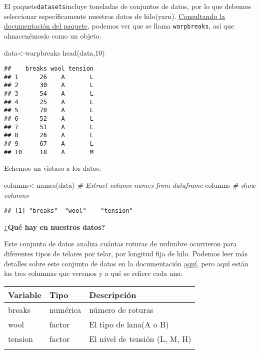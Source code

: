 \documentclass[
]{book}
\newenvironment{Shaded}{\begin{snugshade}}{\end{snugshade}}
\newcommand{\CommentTok}[1]{\textcolor[rgb]{0.56,0.35,0.01}{\textit{#1}}}
\newcommand{\DecValTok}[1]{\textcolor[rgb]{0.00,0.00,0.81}{#1}}
\newcommand{\FunctionTok}[1]{\textcolor[rgb]{0.00,0.00,0.00}{#1}}
\newcommand{\NormalTok}[1]{#1}
\newcommand{\OtherTok}[1]{\textcolor[rgb]{0.56,0.35,0.01}{#1}}
\begin{document}
El paquete\texttt{datasets}incluye toneladas de conjuntos de datos, por lo que debemos seleccionar específicamente nuestros datos de hilo(yarn). \href{https://cran.r-project.org/manuals.html}{Consultando la documentación del paquete}, podemos ver que se llama \texttt{warpbreaks}, así que almacenémoslo como un objeto.

\begin{Shaded}
\begin{Highlighting}[]
\NormalTok{data}\OtherTok{\textless{}{-}}\NormalTok{warpbreaks}
\FunctionTok{head}\NormalTok{(data,}\DecValTok{10}\NormalTok{)}
\end{Highlighting}
\end{Shaded}

\begin{verbatim}
##    breaks wool tension
## 1      26    A       L
## 2      30    A       L
## 3      54    A       L
## 4      25    A       L
## 5      70    A       L
## 6      52    A       L
## 7      51    A       L
## 8      26    A       L
## 9      67    A       L
## 10     18    A       M
\end{verbatim}

Echemos un vistaso a los datos:

\begin{Shaded}
\begin{Highlighting}[]
\NormalTok{columns}\OtherTok{\textless{}{-}}\FunctionTok{names}\NormalTok{(data) }\CommentTok{\# Extract column names from dataframe}
\NormalTok{columns }\CommentTok{\# show columns}
\end{Highlighting}
\end{Shaded}

\begin{verbatim}
## [1] "breaks"  "wool"    "tension"
\end{verbatim}

\textbf{¿Qué hay en nuestros datos?}

Este conjunto de datos analiza cuántas roturas de urdimbre ocurrieron para diferentes tipos de telares por telar, por longitud fija de hilo. Podemos leer más detalles sobre este conjunto de datos en la documentación \href{https://cran.r-project.org/manuals.html}{aquí}, pero aquí están las tres columnas que veremos y a qué se refiere cada una:

\begin{longtable}[]{@{}lll@{}}
\toprule
Variable & Tipo & Descripción \\
\midrule
\endhead
breaks & numérica & número de roturas \\
wool & factor & El tipo de lana(A o B) \\
tension & factor & El nivel de tensión (L, M, H) \\
& & \\
\bottomrule
\end{longtable}
\end{document}
